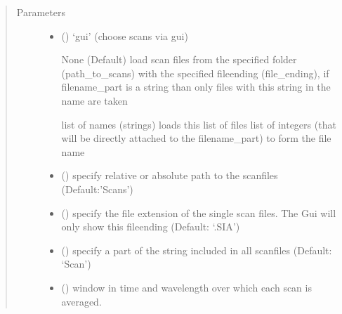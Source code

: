 \documentclass[letterpaper,10pt,english]{sphinxmanual}
\begin{document}
\begin{fulllineitems}
\begin{quote}\begin{description}
\item[{Parameters}] \leavevmode\begin{itemize}
\item {} 
 (\sphinxstyleliteralemphasis{\sphinxupquote{, }}) \textendash{} 
‘gui’ (choose scans via gui)

None (Default) load scan files from the specified folder (path\_to\_scans) with the specified file\sphinxhyphen{}ending
(file\_ending), if filename\_part is a string than only files with this string in the name are taken

list of names (strings) loads this list of files
list of integers (that will be directly attached to the filename\_part) to form the file name


\item {} 
 (\sphinxstyleliteralemphasis{\sphinxupquote{, }}\sphinxstyleliteralemphasis{\sphinxupquote{, }}) \textendash{} specify relative or absolute path to the scan\sphinxhyphen{}files (Default:’Scans’)

\item {} 
 (\sphinxstyleliteralemphasis{\sphinxupquote{, }}) \textendash{} specify the file extension of the single scan files. The Gui will only show this fileending
(Default: ‘.SIA’)

\item {} 
 () \textendash{} specify a part of the string included in all scan\sphinxhyphen{}files (Default: ‘Scan’)

\item {} 
 (\sphinxstyleliteralemphasis{\sphinxupquote{, }}) \textendash{} 
window in time and wavelength over which each scan is averaged.


\end{itemize}
\end{description}
\end{quote}
\end{fulllineitems}
\end{document}

